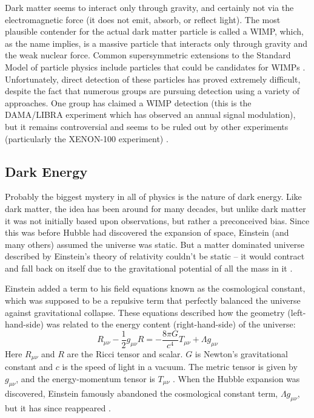 Dark matter seems to interact only through gravity, and certainly not via the electromagnetic force (it does not emit, absorb, or reflect light). The most plausible contender for the actual dark matter particle is called a \acf{WIMP}, which, as the name implies, is a massive particle that interacts only through gravity and the weak nuclear force. Common supersymmetric extensions to the Standard Model of particle physics include particles that could be candidates for \ac{WIMP}s \citep{DodelsonText}. Unfortunately, direct detection of these particles has proved extremely difficult, despite the fact that numerous groups are pursuing detection using a variety of approaches. One group has claimed a WIMP detection (this is the DAMA/LIBRA experiment which has observed an annual signal modulation), but it remains controversial and seems to be ruled out by other experiments (particularly the XENON-100 experiment) \citep{Snowmass13}.

\subsection{Dark Energy}
\label{sec:DE}

Probably the biggest mystery in all of physics is the nature of dark energy. Like dark matter, the idea has been around for many decades, but unlike dark matter it was not initially based upon observations, but rather a preconceived bias. Since this was before Hubble had discovered the expansion of space, Einstein (and many others) assumed the universe was static. But a matter dominated universe described by Einstein's theory of relativity couldn't be static -- it would contract and fall back on itself due to the gravitational potential of all the mass in it \citep{RydenText}. 

Einstein added a term to his field equations known as the cosmological constant, which was supposed to be a repulsive term that perfectly balanced the universe against gravitational collapse. These equations described how the geometry (left-hand-side) was related to the energy content (right-hand-side) of the universe:
\begin{equation}
R_{\mu\nu} - \frac{1}{2} g_{\mu\nu} R =  -\frac{8\pi G}{c^4} T_{\mu\nu} + \Lambda g_{\mu\nu}
\label{eq:Einstein}
\end{equation}
Here $R_{\mu\nu}$ and $R$ are the Ricci tensor and scalar. $G$ is Newton's gravitational constant and $c$ is the speed of light in a vacuum. The metric tensor is given by $g_{\mu\nu}$,  and the energy-momentum tensor is $T_{\mu\nu}$ \citep{Bertone05}. When the Hubble expansion was discovered, Einstein famously abandoned the cosmological constant term, $\Lambda g_{\mu\nu}$, but it has since reappeared \citep{RydenText}.

